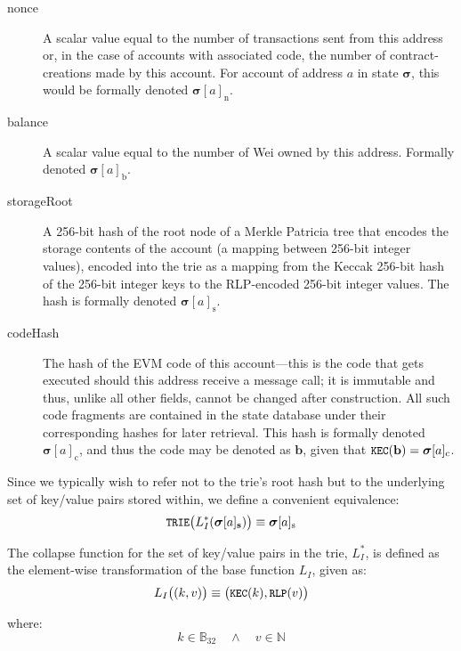 \documentclass[9pt,oneside]{amsart}
\makeatletter
\newcommand{\linkdest}[1]{\Hy@raisedlink{\hypertarget{#1}{}}}
\makeatother
\begin{document}
\begin{multicols}{2}
\begin{description}
\item[nonce] \linkdest{account_nonce}A scalar value equal to the number of transactions sent from this address or, in the case of accounts with associated code, the number of contract-creations made by this account. For account of address $a$ in state $\boldsymbol{\sigma}$, this would be formally denoted $\boldsymbol{\sigma}[a]_{\mathrm{n}}$.
\item[balance] A scalar value equal to the number of Wei owned by this address. Formally denoted $\boldsymbol{\sigma}[a]_{\mathrm{b}}$.
\item[storageRoot] A 256-bit hash of the root node of a Merkle Patricia tree that encodes the storage contents of the account (a mapping between 256-bit integer values), encoded into the trie as a mapping from the Keccak 256-bit hash of the  256-bit integer keys to the RLP-encoded 256-bit integer values. The hash is formally denoted $\boldsymbol{\sigma}[a]_{\mathrm{s}}$.
\item[codeHash] The hash of the EVM code of this account---this is the code that gets executed should this address receive a message call; it is immutable and thus, unlike all other fields, cannot be changed after construction. All such code fragments are contained in the state database under their corresponding hashes for later retrieval. This hash is formally denoted $\boldsymbol{\sigma}[a]_{\mathrm{c}}$, and thus the code may be denoted as $\mathbf{b}$, given that $\texttt{\small KEC}(\mathbf{b}) = \boldsymbol{\sigma}[a]_{\mathrm{c}}$.
\end{description}

Since we typically wish to refer not to the trie's root hash but to the underlying set of key/value pairs stored within, we define a convenient equivalence:
\begin{equation}
\texttt{\small TRIE}\big(L_{I}^*(\boldsymbol{\sigma}[a]_{\mathbf{s}})\big) \equiv \boldsymbol{\sigma}[a]_{\mathrm{s}}
\end{equation}

The collapse function for the set of key/value pairs in the trie, $L_{I}^*$, is defined as the element-wise transformation of the base function $L_{I}$, given as:
\begin{equation}
L_{I}\big( (k, v) \big) \equiv \big(\texttt{\small KEC}(k), \texttt{\small RLP}(v)\big)
\end{equation}

where:
\begin{equation}
k \in \mathbb{B}_{32} \quad \wedge \quad v \in \mathbb{N}
\end{equation}


\end{multicols}
\end{document}

